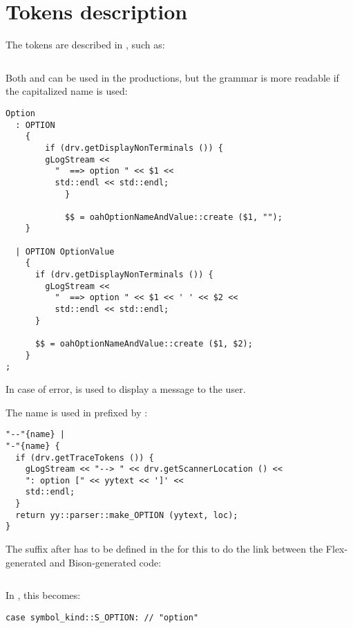 \section{Tokens description}\label{Tokens description}

The tokens are described in , such as:
\begin{lstlisting}[language=Bison]
%token <std::string> OPTION "option"
\end{lstlisting}

Both  and  can be used in the productions, but the grammar is more readable if the capitalized name is used:
\begin{lstlisting}[language=Bison]
Option
  : OPTION
    {
	    if (drv.getDisplayNonTerminals ()) {
        gLogStream <<
          "  ==> option " << $1 <<
          std::endl << std::endl;
			}

			$$ = oahOptionNameAndValue::create ($1, "");
    }

  | OPTION OptionValue
    {
      if (drv.getDisplayNonTerminals ()) {
        gLogStream <<
          "  ==> option " << $1 << ' ' << $2 <<
          std::endl << std::endl;
      }

      $$ = oahOptionNameAndValue::create ($1, $2);
    }
;
\end{lstlisting}

In case of error,  is used to display a message to the user.

The name  is used in  prefixed by :
\begin{lstlisting}[language=Flex]
"--"{name} |
"-"{name} {
  if (drv.getTraceTokens ()) {
    gLogStream << "--> " << drv.getScannerLocation () <<
    ": option [" << yytext << ']' <<
    std::endl;
  }
  return yy::parser::make_OPTION (yytext, loc);
}
\end{lstlisting}

The suffix after  has to be defined in the  for this to do the link between the Flex-generated and Bison-generated code:
\begin{lstlisting}[language=Terminal]
%token <std::string> OPTION "option"
\end{lstlisting}

In , this becomes:
\begin{lstlisting}[language=CPlusPlus]
      case symbol_kind::S_OPTION: // "option"
\end{lstlisting}

